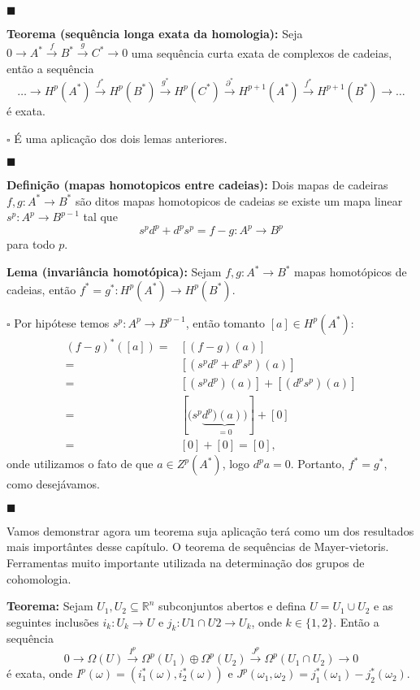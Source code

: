 \documentclass{article}
\begin{document}
	$\blacksquare$
	
	\vspace{2mm}
	\textbf{Teorema (sequência longa exata da homologia):} Seja $0 \to A^{*} \xrightarrow{f} B^{*} \xrightarrow{g} C^{*} \to 0$ uma sequência curta exata de complexos de cadeias, então a sequência $$
	\dots \to H^{p}(A^{*}) \xrightarrow{f^{*}} H^{p}(B^{*}) \xrightarrow{g^{*}} H^{p}(C^{*}) \xrightarrow{\partial^{*}} H^{p+1}(A^{*}) \xrightarrow{f^{*}} H^{p+1}(B^{*}) \to \dots
	$$
	é exata.
	
	$\square$ É uma aplicação dos dois lemas anteriores. 
	
	$\blacksquare$
	
	\vspace{2mm}
	\textbf{Definição (mapas homotopicos entre cadeias):} Dois mapas de cadeiras $f,g : A^{*} \to B^{*}$ são ditos mapas homotopicos de cadeias se existe um mapa linear $s^{p}: A^{p} \to B^{p-1}$ tal que
	$$
	s^{p}d^{p} + d^{p}s^{p} = f-g : A^{p} \to B^{p}
	$$
	para todo $p$.
	
	\vspace{2mm}
	\textbf{Lema (invariância homotópica):} Sejam $f,g : A^{*} \to B^{*}$ mapas homotópicos de cadeias, então $f^{*} = g^{*}: H^{p}(A^{*}) \to H^{p}(B^{*})$.
	
	$\square$ Por hipótese temos $s^{p}: A^{p} \to B^{p-1}$, então tomanto $[a] \in H^{p}(A^{*})$:
	$$
	\begin{aligned}
	(f-g)^{*}([a]) =& [(f-g)(a)]
	\\
	=& [(s^{p}d^{p} + d^{p}s^{p})(a)]
	\\
	=& [(s^{p}d^{p})(a)] + [(d^{p}s^{p})(a)]
	\\
	=& [(s^{p} \underbrace{d^{p})(a))}_{
		=0}] +[0]
	\\
	=& [0]+[0] = [0],
	\end{aligned}
	$$ 
	onde utilizamos o fato de que $a\in Z^{p}(A^{*})$, logo $d^{p}a = 0$. Portanto, $f^{*} = g^{*}$, como desejávamos. 
	
	$\blacksquare$
	
	Vamos demonstrar agora um teorema suja aplicação terá como um dos resultados mais importântes desse capítulo. O teorema de sequências de Mayer-vietoris. Ferramentas muito importante utilizada na determinação dos grupos de cohomologia.
	
	\vspace{2mm}
	\textbf{Teorema:} Sejam $U_{1}, U_{2} \subseteq \mathbb{R}^{n}$ subconjuntos abertos e defina $U=U_{1} \cup U_{2}$ e as seguintes inclusões $i_{k}: U_{k} \to U$ e $j_{k}: U{1}\cap U{2} \to U_{k}$, onde $k \in \{1,2\}$. Então a sequência
	$$
	0 \to \Omega(U) \xrightarrow{I^{p}} \Omega^{p}(U_{1}) \oplus \Omega^{p}(U_{2}) \xrightarrow{J^{p}} \Omega^{p}(U_{1} \cap U_{2}) \to 0 
	$$
	é exata, onde $I^{p}(\omega) = (i^{*}_{1}(\omega), i^{*}_{2}(\omega))$ e $J^{p}(\omega_{1}, \omega_{2}) = j^{*}_{1}(\omega_{1})- j^{*}_{2}(\omega_{2})$.
	
\end{document}
